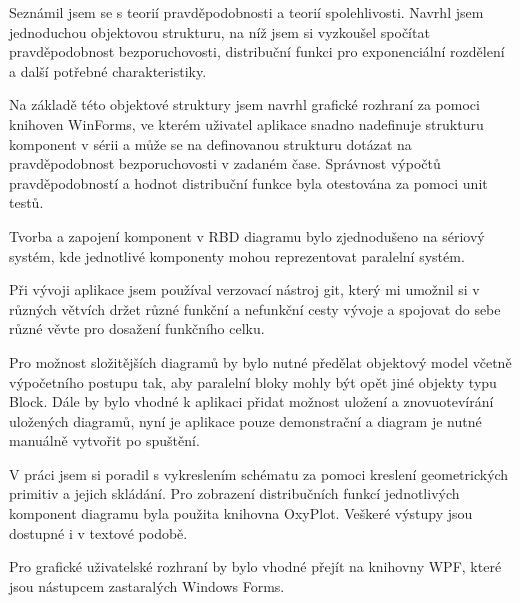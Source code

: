 \documentclass[FM,RP]{tulthesis}
\begin{document}
    Seznámil jsem se s teorií pravděpodobnosti a teorií spolehlivosti.
    Navrhl jsem jednoduchou objektovou strukturu, na níž jsem si vyzkoušel spočítat pravděpodobnost bezporuchovosti, 
    distribuční funkci pro exponenciální rozdělení a další potřebné charakteristiky.

    Na základě této objektové struktury jsem navrhl grafické rozhraní za pomoci knihoven WinForms, 
    ve kterém uživatel aplikace snadno nadefinuje strukturu komponent v sérii a může se na definovanou strukturu dotázat
    na pravděpodobnost bezporuchovosti v zadaném čase. Správnost výpočtů pravděpodobností a hodnot distribuční funkce byla otestována za pomoci unit testů.

    Tvorba a zapojení komponent v RBD diagramu bylo zjednodušeno na sériový systém, kde jednotlivé komponenty mohou reprezentovat paralelní systém.

    Při vývoji aplikace jsem používal verzovací nástroj git, který mi umožnil si v různých větvích držet různé funkční a nefunkční cesty vývoje a spojovat do sebe různé
    věvte pro dosažení funkčního celku. \cite{7}

    Pro možnost složitějších diagramů by bylo nutné předělat objektový model včetně výpočetního postupu tak, aby paralelní bloky mohly být opět jiné objekty typu Block.
    Dále by bylo vhodné k aplikaci přidat možnost uložení a znovuotevírání uložených diagramů,
    nyní je aplikace pouze demonstrační a diagram je nutné manuálně vytvořit po spuštění.

    V práci jsem si poradil s vykreslením schématu za pomoci kreslení geometrických primitiv a jejich skládání. 
    Pro zobrazení distribučních funkcí jednotlivých komponent diagramu byla použita knihovna OxyPlot.
    Veškeré výstupy jsou dostupné i v textové podobě.

    Pro grafické uživatelské rozhraní by bylo vhodné přejít na knihovny WPF, které jsou nástupcem zastaralých Windows Forms.
\end{document}
